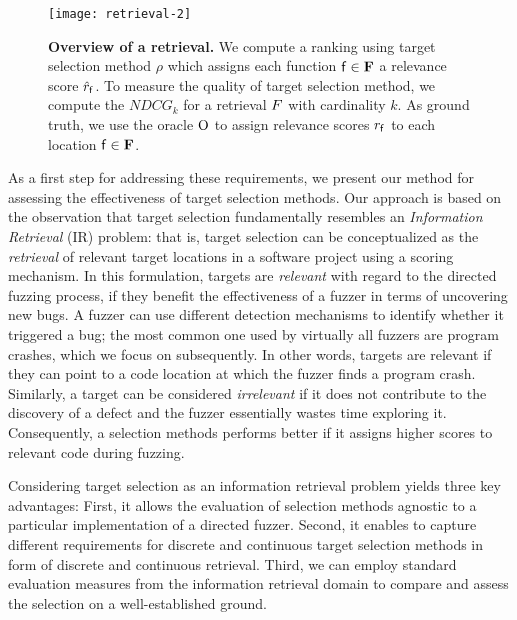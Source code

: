 \begin{figure}[t]
	\centering
	\texttt{[image: retrieval-2]}
    \vspace{-0.25em}
	\caption{\textbf{Overview of a retrieval.} \normalfont We compute a ranking using target selection method $\rho$ which assigns each function $\mathsf{f} \in \mathbf{F}$ a relevance score $\hat{r}_{\mathsf{f}}$. To measure the quality of target selection method, we compute the $NDCG_k$ for a retrieval $F$ with cardinality $k$. As ground truth, we use the oracle $\mathrm{O}$ to assign relevance scores $r_{\mathsf{f}}$ to each location $\mathsf{f} \in \mathbf{F}$.}
	\label{fig:recallatk}
\end{figure}

As a first step for addressing these requirements,  we present our method for assessing the effectiveness of target selection methods. Our approach is based on the observation that target selection fundamentally resembles an \emph{Information Retrieval} (IR) problem: that is, target selection can be conceptualized as the \emph{retrieval} of relevant target locations in a software project using a scoring mechanism.
%
In this formulation, targets are \emph{relevant} with regard to the directed fuzzing process, if they benefit the effectiveness of a fuzzer in terms of uncovering new bugs. A fuzzer can use different detection mechanisms to identify whether it triggered a bug; the most common one used by virtually all fuzzers are program crashes, which we focus on subsequently. In other words, targets are relevant if they can point to a code location at which the fuzzer finds a program crash. Similarly, a target can be considered \emph{irrelevant} if it does not contribute to the discovery of a defect and the fuzzer essentially wastes time exploring it. Consequently, a selection methods performs better if it assigns higher scores to relevant code during fuzzing.

Considering target selection as an information retrieval problem yields three key advantages: First, it allows the evaluation of selection methods agnostic to a particular implementation of a directed fuzzer.
Second, it enables to capture different requirements for discrete and continuous target selection methods in form of discrete and continuous retrieval.
%
Third, we can employ standard evaluation measures from the information retrieval domain to compare and assess the selection on a well-established ground.

